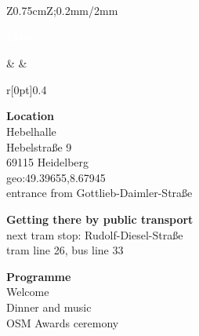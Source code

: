 \begin{landscape}
\begin{center}
    \label{social-event}%
    \enlargethispage{1\baselineskip}%
    \newlength\socialEventBoxWidth
    \setlength{\socialEventBoxWidth}{10.82cm}
    \newlength\socialEventSectionSep
    \setlength{\socialEventSectionSep}{\baselineskip}
    \noindent\begin{tabular}{Z{0.75cm}Z{\socialEventBoxWidth};{0.2mm/2mm}}
      \parbox[t]{\linewidth}{%
        \textcolor{white}{19:00}%
      }%
      &
      \tabularnewline
      &
      \begin{minipage}[t]{\socialEventBoxWidth}
        \noindent\begin{minipage}[t]{0.47\linewidth}
          \vspace{-0.56\baselineskip}
          \begin{wrapfigure}[6]{r}[0pt]{0.4\linewidth}%
            \vspace{-1\baselineskip}%
          \end{wrapfigure}%
          \textbf{Location}\\
          Hebelhalle\\
          Hebelstraße 9\\
          69115 Heidelberg\\
          geo:49.39655,8.67945\\
          entrance from Gottlieb-Daimler-Straße

          \vspace{\socialEventSectionSep}
          \textbf{Getting there by public transport}\\
          next tram stop: Rudolf-Diesel-Straße\\
          tram line 26, bus line 33

          \vspace{\socialEventSectionSep}
          \textbf{Programme}\\
          Welcome\\
          Dinner and music\\
          OSM Awards ceremony


\end{minipage}
\end{minipage}
\end{tabular}
\end{center}
\end{landscape}

